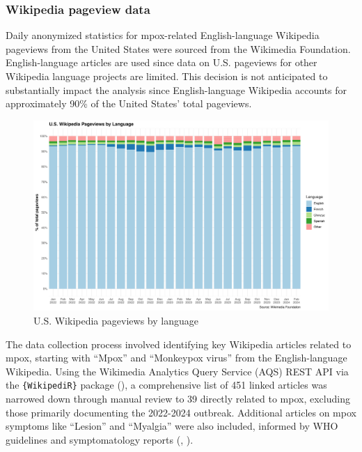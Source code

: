 \documentclass[
  12pt,
]{article}
\begin{document}
\subsubsection{Wikipedia pageview data}\label{wikipedia-pageview-data}

Daily anonymized statistics for mpox-related English-language Wikipedia
pageviews from the United States were sourced from the Wikimedia
Foundation. English-language articles are used since data on U.S.
pageviews for other Wikipedia language projects are limited. This
decision is not anticipated to substantially impact the analysis since
English-language Wikipedia accounts for approximately 90\% of the United
States' total pageviews.

\begin{figure}[H]

{\centering \includegraphics{images/wiki-project-views.png}

}

\caption{U.S. Wikipedia pageviews by language}

\end{figure}%

The data collection process involved identifying key Wikipedia articles
related to mpox, starting with ``Mpox'' and ``Monkeypox virus'' from the
English-language Wikipedia. Using the Wikimedia Analytics Query Service
(AQS) REST API via the \texttt{\{WikipediR\}} package
(), a
comprehensive list of 451 linked articles was narrowed down through
manual review to 39 directly related to mpox, excluding those primarily
documenting the 2022-2024 outbreak. Additional articles on mpox symptoms
like ``Lesion'' and ``Myalgia'' were also included, informed by WHO
guidelines and symptomatology reports (, ).
\end{document}

